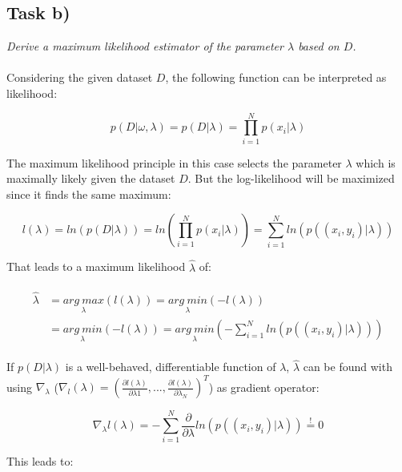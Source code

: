 \documentclass{article}
\begin{document}
\subsection*{Task b)}

\textit{Derive a maximum likelihood estimator of the parameter $\lambda$ based on $D$.}\\
\\
Considering the given dataset $D$, the following function can be interpreted as likelihood:

\begin{equation}
p(D|\omega,\lambda) = p(D|\lambda) = \prod_{i=1}^{N} p(x_i|\lambda)
\end{equation}

The maximum likelihood principle in this case selects the parameter $\lambda$ which is maximally likely given the dataset $D$. But the log-likelihood will be maximized since it finds the same maximum:

\begin{equation}
l(\lambda) = ln(p(D|\lambda)) = ln(\prod_{i=1}^{N} p(x_i|\lambda)) = \sum_{i=1}^{N} ln(p((x_i, y_i)|\lambda))
\end{equation}

That leads to a maximum likelihood $\hat{\lambda}$ of:

\begin{align}
\begin{aligned}
\hat{\lambda} 	& = \underset{\lambda}{arg ~ max} (l(\lambda)) = \underset{\lambda}{arg ~ min} (- l(\lambda))\\
			& = \underset{\lambda}{arg ~ min} (- l(\lambda)) = \underset{\lambda}{arg ~ min} (-  \sum_{i=1}^{N} ln(p((x_i, y_i)|\lambda)))
\end{aligned}
\end{align}

If $p(D|\lambda)$ is a well-behaved, differentiable function of $\lambda$, $\hat{\lambda}$ can be found with using $\nabla_\lambda$ ($\nabla_l (\lambda) = (\frac{\partial l(\lambda)}{\partial\lambda1}, . . . , \frac{\partial l(\lambda)}{ \partial\lambda_N})^T$) as gradient operator: 

\begin{equation}\label{eq:mincond}
\nabla_\lambda l(\lambda) = -  \sum_{i=1}^{N} \frac{\partial}{\partial \lambda} ln(p((x_i, y_i)|\lambda)) \overset{!}{=} 0
\end{equation}

This leads to:
\end{document}
